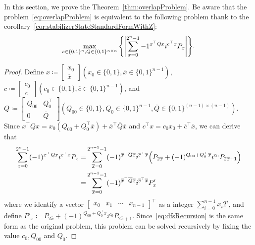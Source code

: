 \documentclass[a4paper, onecolumn, 11pt, longbibliography]{quantumarticle}
\newcommand{\defeq}{\coloneqq}
\begin{document}
In this section, we prove the Theorem~\ref{thm:overlapProblem}.
Be aware that the problem~\eqref{eq:overlapProblem}
is equivalent to the following problem thank to the corollary~\ref{cor:stabilizerStateStandardFormWithZ}:
\begin{equation*}
  \max_{c\in \{0,1\}^n, Q\in \{0,1\}^{n \times n}} \qty{ \abs{\sum_{x=0}^{2^n-1} -1^{x^\top Q x} i^{c^\top x} P_x} }.
\end{equation*}
\overlapProblem*
\begin{proof}
  Define $x \defeq \begin{bmatrix}
      x_0 \\
      \overline{x}
    \end{bmatrix} (x_0 \in \{0,1\}, \overline{x} \in \{0,1\}^{n-1})$,
  $c \defeq \begin{bmatrix}
      c_0 \\
      \overline{c}
    \end{bmatrix} (c_0 \in \{0,1\}, \overline{c} \in \{0,1\}^{n-1})$, and
  $Q \defeq \begin{bmatrix}
      Q_{00} & Q_{0}^\top   \\
      0      & \overline{Q}
    \end{bmatrix} (Q_{00} \in \{0,1\}, Q_0 \in \{0,1\}^{n-1}, \overline{Q} \in \{0,1\}^{(n-1) \times (n-1)})$.
  Since
  $x^\top Q x = x_0 (Q_{00}+Q_0^\top \overline{x}) + \overline{x}^\top \overline{Q} \overline{x}$
  and
  $c^\top x = c_0 x_0 + \overline{c}^\top \overline{x}$,
  we can derive that
  \begin{align}
    \sum_{x=0}^{2^n-1} (-1)^{x^\top Q x} i^{c^\top x} P_x
    = & \sum_{\overline{x}=0}^{2^{n-1}-1} (-1)^{\overline{x}^\top \overline{Q} \overline{x}} i^{\overline{c}^\top \overline{x}}
    \qty(P_{2\overline{x}} + (-1)^{Q_{00}+Q_0^\top \overline{x}} i^{c_0} P_{2\overline{x}+1})                                   \notag                       \\
    = & \sum_{\overline{x}=0}^{2^{n-1}-1} (-1)^{\overline{x}^\top \overline{Q} \overline{x}} i^{\overline{c}^\top \overline{x}} P'_x \label{eq:dfsRecursion}
  \end{align}
  where we identify a vector
  $\begin{bmatrix}
      x_0 & x_1 & \cdots & x_{n-1}
    \end{bmatrix}^\top$
  as a integer $\sum_{i=0}^{n-1} x_i 2^i$,
  and define
  $P'_x \defeq P_{2\overline{x}} + (-1)^{Q_{00}+Q_0^\top \overline{x}} i^{c_0} P_{2\overline{x}+1}$.
  Since~\eqref{eq:dfsRecursion} is the same form as the original problem, this problem can be solved recursively
  by fixing the value $c_0,Q_{00}$ and $Q_0$.


\end{proof}
\end{document}
